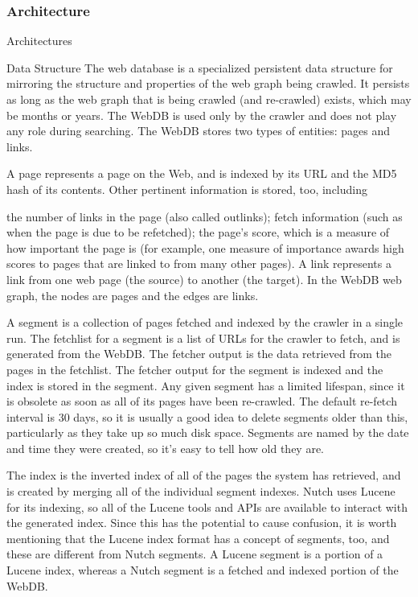 {\subsubsection{Architecture}

Architectures


Data Structure
The web database is a specialized persistent data structure for mirroring the structure and properties of the web graph being crawled. It persists as long as the web graph that is being crawled (and re-crawled) exists, which may be months or years. The WebDB is used only by the crawler and does not play any role during searching. The WebDB stores two types of entities: pages and links.

A page represents a page on the Web, and is indexed by its URL and the MD5 hash of its contents. Other pertinent information is stored, too, including

the number of links in the page (also called outlinks);
fetch information (such as when the page is due to be refetched);
the page's score, which is a measure of how important the page is (for example, one measure of importance awards high scores to pages that are linked to from many other pages).
A link represents a link from one web page (the source) to another (the target). In the WebDB web graph, the nodes are pages and the edges are links.

A segment is a collection of pages fetched and indexed by the crawler in a single run. The fetchlist for a segment is a list of URLs for the crawler to fetch, and is generated from the WebDB. The fetcher output is the data retrieved from the pages in the fetchlist. The fetcher output for the segment is indexed and the index is stored in the segment. Any given segment has a limited lifespan, since it is obsolete as soon as all of its pages have been re-crawled. The default re-fetch interval is 30 days, so it is usually a good idea to delete segments older than this, particularly as they take up so much disk space. Segments are named by the date and time they were created, so it's easy to tell how old they are.

The index is the inverted index of all of the pages the system has retrieved, and is created by merging all of the individual segment indexes. Nutch uses Lucene for its indexing, so all of the Lucene tools and APIs are available to interact with the generated index. Since this has the potential to cause confusion, it is worth mentioning that the Lucene index format has a concept of segments, too, and these are different from Nutch segments. A Lucene segment is a portion of a Lucene index, whereas a Nutch segment is a fetched and indexed portion of the WebDB.

}
